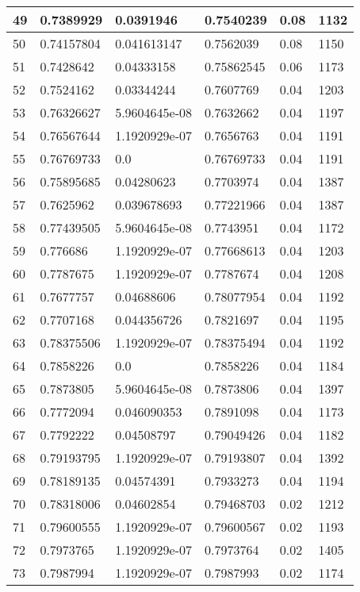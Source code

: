 \begin{longtable}{|l|l|l|l|l|l|}
49 & 0.7389929 & 0.0391946 & 0.7540239 & 0.08 & 1132 \\ \hline 
50 & 0.74157804 & 0.041613147 & 0.7562039 & 0.08 & 1150 \\ \hline 
51 & 0.7428642 & 0.04333158 & 0.75862545 & 0.06 & 1173 \\ \hline 
52 & 0.7524162 & 0.03344244 & 0.7607769 & 0.04 & 1203 \\ \hline 
53 & 0.76326627 & 5.9604645e-08 & 0.7632662 & 0.04 & 1197 \\ \hline 
54 & 0.76567644 & 1.1920929e-07 & 0.7656763 & 0.04 & 1191 \\ \hline 
55 & 0.76769733 & 0.0 & 0.76769733 & 0.04 & 1191 \\ \hline 
56 & 0.75895685 & 0.04280623 & 0.7703974 & 0.04 & 1387 \\ \hline 
57 & 0.7625962 & 0.039678693 & 0.77221966 & 0.04 & 1387 \\ \hline 
58 & 0.77439505 & 5.9604645e-08 & 0.7743951 & 0.04 & 1172 \\ \hline 
59 & 0.776686 & 1.1920929e-07 & 0.77668613 & 0.04 & 1203 \\ \hline 
60 & 0.7787675 & 1.1920929e-07 & 0.7787674 & 0.04 & 1208 \\ \hline 
61 & 0.7677757 & 0.04688606 & 0.78077954 & 0.04 & 1192 \\ \hline 
62 & 0.7707168 & 0.044356726 & 0.7821697 & 0.04 & 1195 \\ \hline 
63 & 0.78375506 & 1.1920929e-07 & 0.78375494 & 0.04 & 1192 \\ \hline 
64 & 0.7858226 & 0.0 & 0.7858226 & 0.04 & 1184 \\ \hline 
65 & 0.7873805 & 5.9604645e-08 & 0.7873806 & 0.04 & 1397 \\ \hline 
66 & 0.7772094 & 0.046090353 & 0.7891098 & 0.04 & 1173 \\ \hline 
67 & 0.7792222 & 0.04508797 & 0.79049426 & 0.04 & 1182 \\ \hline 
68 & 0.79193795 & 1.1920929e-07 & 0.79193807 & 0.04 & 1392 \\ \hline 
69 & 0.78189135 & 0.04574391 & 0.7933273 & 0.04 & 1194 \\ \hline 
70 & 0.78318006 & 0.04602854 & 0.79468703 & 0.02 & 1212 \\ \hline 
71 & 0.79600555 & 1.1920929e-07 & 0.79600567 & 0.02 & 1193 \\ \hline 
72 & 0.7973765 & 1.1920929e-07 & 0.7973764 & 0.02 & 1405 \\ \hline 
73 & 0.7987994 & 1.1920929e-07 & 0.7987993 & 0.02 & 1174 \\ \hline 

\end{longtable}
